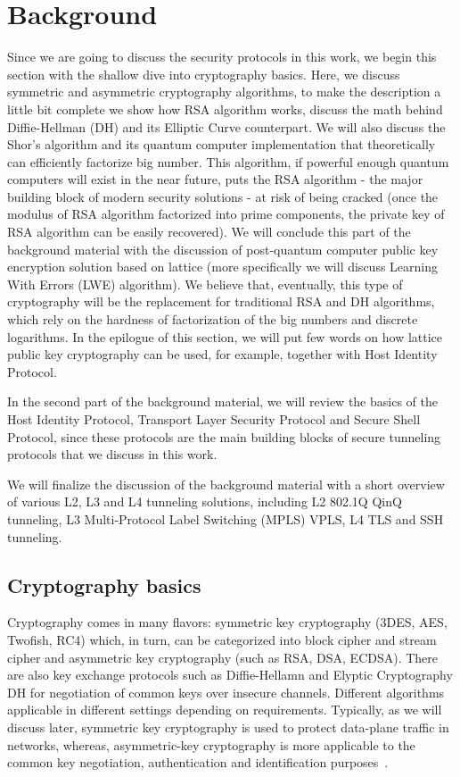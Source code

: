 \chapter{Background}

Since we are going to discuss the security protocols in this work, we begin 
this section with the shallow dive into cryptography basics. Here, we discuss 
symmetric and asymmetric cryptography algorithms, to make the description a 
little bit complete we show how RSA algorithm works, discuss the math behind 
Diffie-Hellman (DH) and its Elliptic Curve counterpart. We will also discuss 
the Shor’s algorithm and its quantum computer implementation that theoretically 
can efficiently factorize big number. This algorithm, if powerful enough quantum 
computers will exist in the near future, puts the RSA algorithm - the major 
building block of modern security solutions - at risk of being cracked (once the 
modulus of RSA algorithm factorized into prime components, the private key of RSA 
algorithm can be easily recovered). We will conclude this part of the background 
material with the discussion of post-quantum computer public key encryption 
solution based on lattice (more specifically we will discuss Learning With Errors 
(LWE) algorithm). We believe that, eventually, this type of cryptography will be 
the replacement for traditional RSA and DH algorithms, which rely on the hardness 
of factorization of the big numbers and discrete logarithms. In the epilogue of this 
section, we will put few words on how lattice public key cryptography can be used, 
for example, together with Host Identity Protocol.

In the second part of the background material, we will review the basics of the Host 
Identity Protocol, Transport Layer Security Protocol and Secure Shell Protocol, since 
these protocols are the main building blocks of secure tunneling protocols that we
discuss in this work.

We will finalize the discussion of the background material with a short overview of 
various L2, L3 and L4 tunneling solutions, including L2 802.1Q QinQ tunneling, 
L3 Multi-Protocol Label Switching (MPLS) VPLS, L4 TLS and SSH tunneling.


\section{Cryptography basics}

Cryptography comes in many flavors: symmetric key cryptography 
(3DES, AES, Twofish, RC4) which, in turn, can be categorized into 
block cipher and stream cipher and asymmetric key cryptography 
(such as RSA, DSA, ECDSA). There are also key exchange protocols 
such as Diffie-Hellamn and Elyptic Cryptography DH for negotiation 
of common keys over insecure channels. Different algorithms applicable 
in different settings depending on requirements. Typically, as we will 
discuss later, symmetric key cryptography is used to protect 
data-plane traffic in networks, whereas, asymmetric-key cryptography is 
more applicable to the common key negotiation, authentication and 
identification purposes~\cite{Stinson:Cryptography}.

